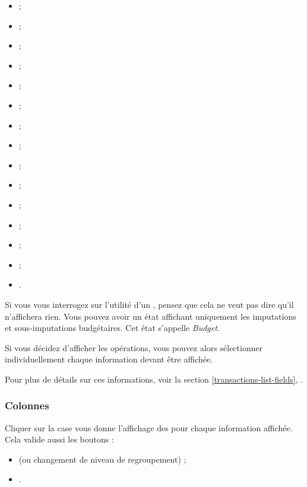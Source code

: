 \begin{itemize}
	\item {} ;
	\item {} ;
	\item {} ;	
	\item {} ;
	\item {} ;
	\item {} ;
	\item {} ;
	\item {} ;
	\item {} ;
	\item {} ;
	\item {} ;
	\item {} ;
	\item {} ;
	\item {} ;
	\item {}.
\end{itemize}

Si vous vous interrogez sur l'utilité d'un , pensez 
que cela ne veut pas dire qu'il n'affichera rien. Vous pouvez avoir un 
état affichant uniquement les imputations et sous-imputations 
budgétaires. Cet état s'appelle \emph{Budget}.

Si vous décidez d'afficher les opérations, vous pouvez alors sélectionner
individuellement chaque information devant être affichée.

Pour plus de détails sur ces informations, voir la section \vref{transactions-list-fields}, .


\subsubsection{Colonnes\label{reportscreation-display-transactions-coltitles}}

Cliquer sur la case  vous donne l'affichage des  pour chaque information affichée. Cela valide aussi les boutons :

\begin{itemize}
	\item  {} (ou changement de niveau de regroupement) ;
	\item {}.
\end{itemize}
 
